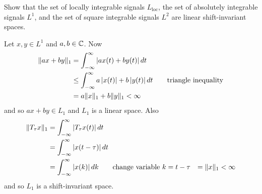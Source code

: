 \begin{excersizelist}

\item \label{exer:L1L2linearshiftinvariant} Show that the set of locally integrable signals $L_{\text{loc}}$, the set of absolutely integrable signals $L^1$, and the set of square integrable signals $L^2$ are linear shift-invariant spaces. 
\begin{solution}
Let $x, y \in L^1$ and $a, b \in {\mathbb C}$.  Now
\begin{align*}
\|a x + b y\|_1 &= \int_{-\infty}^\infty \left\vert ax(t) + by(t) \right\vert dt \\
&\leq \int_{-\infty}^\infty a\left\vert x(t) \right\vert + b\left\vert y(t) \right\vert dt \qquad \text{triangle inequality} \\
&= a \|x\|_1 + b\|y\|_1 < \infty
\end{align*}
and so $ax + by \in L_1$ and $L_1$ is a linear space.  Also
\begin{align*}
\|T_\tau x\|_1 &= \int_{-\infty}^\infty \left\vert  T_\tau x(t)  \right\vert dt \\
&= \int_{-\infty}^\infty \left\vert x(t - \tau) \right\vert dt \\
&= \int_{-\infty}^\infty \left\vert x(k) \right\vert dk \qquad \text{change variable $k = t - \tau$}
&= \|x\|_1 < \infty
\end{align*}
and so $L_1$ is a shift-invariant space.


\end{solution}
\end{excersizelist}
